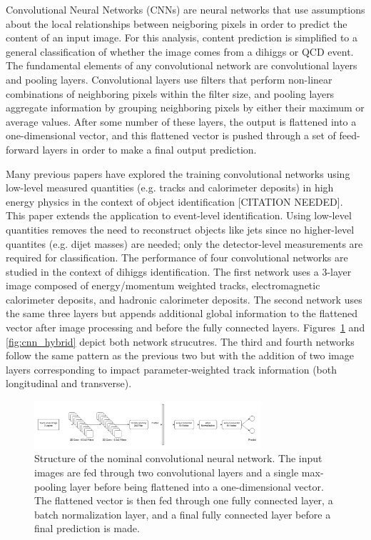\label{sec:CNN}
Convolutional Neural Networks (CNNs) are neural networks that use assumptions about the local relationships between neigboring pixels in order to predict the content of an input image. For this analysis, content prediction is simplified to a general classification of whether the image comes from a dihiggs or QCD event. The fundamental elements of any convolutional network are convolutional layers and pooling layers. Convolutional layers use filters that perform non-linear combinations of neighboring pixels within the filter size, and pooling layers aggregate information by grouping neighboring pixels by either their maximum or average values. After some number of these layers, the output is flattened into a one-dimensional vector, and this flattened vector is pushed through a set of feed-forward layers in order to make a final output prediction. 

Many previous papers have explored the training convolutional networks using low-level measured quantities (e.g. tracks and calorimeter deposits) in high energy physics in the context of object identification [CITATION NEEDED]. This paper extends the application to event-level identification. Using low-level quantities removes the need to reconstruct objects like jets since no higher-level quantites (e.g. dijet masses) are needed; only the detector-level measurements are required for classification. The performance of four convolutional networks are studied in the context of dihiggs identification. The first network uses a 3-layer image composed of energy/momentum weighted tracks, electromagnetic calorimeter deposits, and hadronic calorimeter deposits. The second network uses the same three layers but appends additional global information to the flattened vector after image processing and before the fully connected layers. Figures~\ref{fig:cnn_nominal} and \ref{fig:cnn_hybrid} depict both network strucutres. The third and fourth networks follow the same pattern as the previous two but with the addition of two image layers corresponding to impact parameter-weighted track information (both longitudinal and transverse).

\begin{figure}[!h] 
\begin{center}
\includegraphics*[width=0.75\textwidth] {CNN/figures/nominalCNN.png}
\caption{Structure of the nominal convolutional neural network. The input images are fed through two convolutional layers and a single max-pooling layer before being flattened into a one-dimensional vector. The flattened vector is then fed through one fully connected layer, a batch normalization layer, and a final fully connected layer before a final prediction is made.}
  \label{fig:cnn_nominal}
\end{center}
\end{figure}


